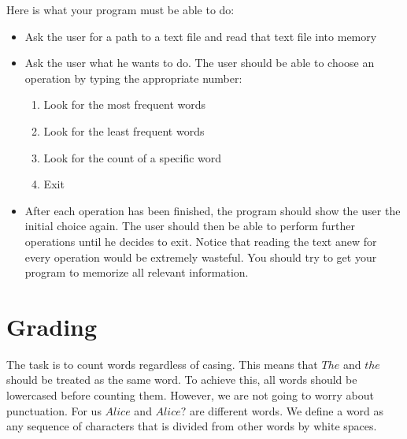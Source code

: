 \documentclass[11pt, leqno, a4paper]{article}
\begin{document}
Here is what your program must be able to do:
\begin{itemize}
\item Ask the user for a path to a text file and read that text file into memory
\item Ask the user what he wants to do. The user should be able to choose an operation by typing the appropriate number:
\begin{enumerate}
\item Look for the most frequent words
\item Look for the least frequent words
\item Look for the count of a specific word
\item Exit
\end{enumerate}
\item After each operation has been finished, the program should show the user the initial choice again. The user should then 
be able to perform further operations until 
he decides to exit. Notice that reading the text anew for every operation would be extremely wasteful. You should try to get your program to memorize all
relevant information.
\end{itemize}

\section{Grading}
The task is to count words regardless of casing. This means that $ The $ and $ the $ should be treated as the same word. To achieve this, all words should be lowercased before counting them. However, we are not going to worry about punctuation. For us $ Alice $ and $ Alice? $ are different words. We define a word as any sequence
of characters that is divided from other words by white spaces.
\end{document}
